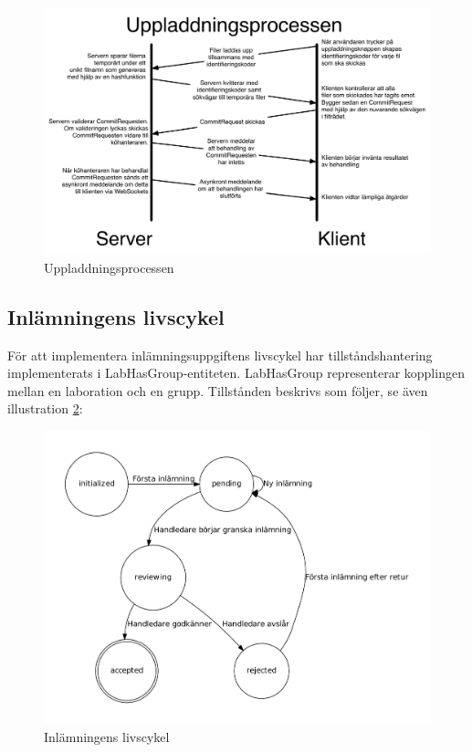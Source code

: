\begin{figure}
  \includegraphics[width=15.0cm]{fig/misc/uppladdningsprocessen.pdf}             
  \caption[Uppladdningsprocessen]
  {Uppladdningsprocessen}
  \label{fig:uppladdning}
\end{figure}

\subsection{Inlämningens livscykel}

För att implementera inlämningsuppgiftens livscykel har tillståndshantering implementerats i LabHasGroup-entiteten. LabHasGroup representerar kopplingen mellan en laboration och en grupp.
Tillstånden beskrivs som följer, se även illustration \ref{fig:cyk}:

\begin{figure}
  \includegraphics[width=15.0cm]{fig/labgroup/state-machine.pdf}             
  \caption[Inlämningsuppgiftens livscykel]
  {Inlämningens livscykel}
  \label{fig:cyk}
\end{figure}

